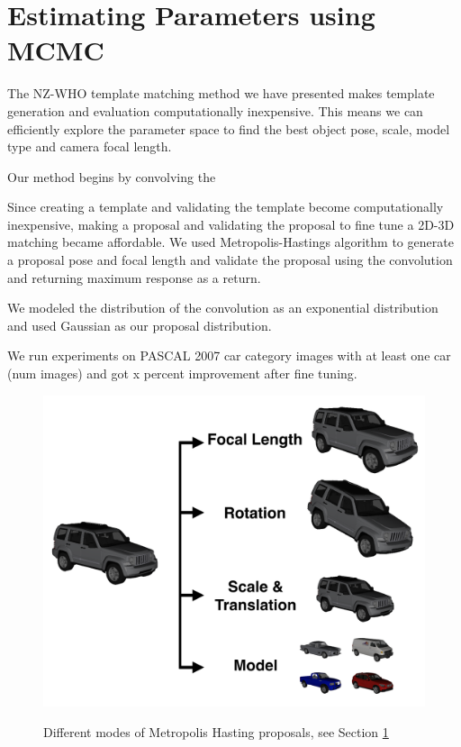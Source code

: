 \documentclass[10pt,twocolumn,letterpaper]{article}
\begin{document}
\section{Estimating Parameters using MCMC}
\label{sec:fine}
The NZ-WHO template matching method we have presented makes template generation
and evaluation computationally inexpensive. This means we can efficiently
explore the parameter space to find the best object pose, scale, model type and
camera focal length.

Our method begins by convolving the 

Since creating a template and validating the template become computationally
inexpensive, making a proposal and validating the proposal to fine tune a 2D-3D
matching became affordable. We used Metropolis-Hastings algorithm to generate a
proposal pose and focal length and validate the proposal using the convolution
and returning maximum response as a return.

We modeled the distribution of the convolution as an exponential distribution
and used Gaussian as our proposal distribution.  

We run experiments on PASCAL 2007 car category images with at least one car
(num images) and got x percent improvement after fine tuning.

\begin{figure}[t]
\centering
    \includegraphics[width=0.7\linewidth]{tuning2} \\ [-5pt]
    \caption{Different modes of Metropolis Hasting proposals, see Section \ref{sec:fine}}
 \label{fig:tuningmode}
\end{figure}
    
\end{document}
